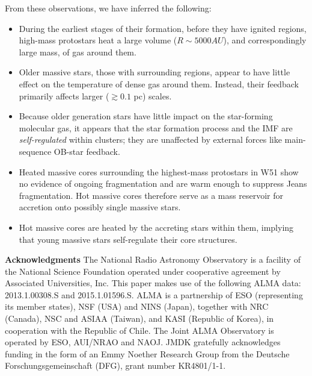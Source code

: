\documentclass{emulateapj}
\begin{document}
From these observations, we have inferred the following: 
\begin{itemize}
    \item During the earliest stages of their formation, before they have 
        ignited \hii regions, high-mass protostars heat a large volume
        ($R\sim5000 AU$), and correspondingly large mass, of gas around them.
    \item Older massive stars, those with surrounding \hii regions, appear
        to have little effect on the temperature of dense gas around them.
        Instead, their feedback primarily affects larger ($\gtrsim 0.1$ pc)
        scales.
    \item Because older generation stars have little impact on the star-forming
        molecular gas, it appears that the star formation process and the IMF
        are \emph{self-regulated} within clusters; they are unaffected by
        external forces like main-sequence OB-star feedback.
    \item Heated massive cores surrounding the highest-mass protostars in
        W51 show no evidence of ongoing fragmentation and are warm enough
        to suppress Jeans fragmentation.  Hot massive cores therefore serve as
        a mass reservoir for accretion onto possibly single massive stars.
    \item Hot massive cores are heated by the accreting stars within them,
        implying that young massive stars self-regulate their  core
        structures.
\end{itemize}



\textbf{Acknowledgments}
The National Radio Astronomy Observatory is a facility of the National Science
Foundation operated under cooperative agreement by Associated Universities,
Inc.
This paper makes use of the following ALMA data: 2013.1.00308.S 
and 2015.1.01596.S.
ALMA is a partnership of ESO (representing its member states), NSF (USA) and
NINS (Japan), together with NRC (Canada), NSC and ASIAA (Taiwan), and KASI
(Republic of Korea), in cooperation with the Republic of Chile. The Joint ALMA
Observatory is operated by ESO, AUI/NRAO and NAOJ.
JMDK gratefully acknowledges funding in the form of an
Emmy Noether Research Group from the Deutsche Forschungsgemeinschaft (DFG),
grant number KR4801/1-1.
\end{document}
